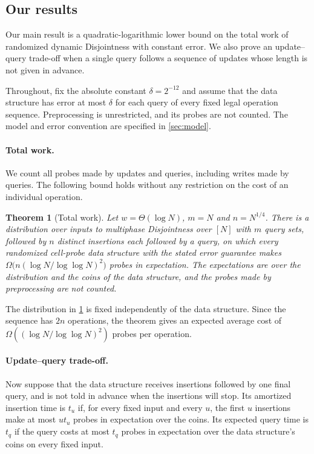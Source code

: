 \documentclass[11pt]{article}
\theoremstyle{plain}
\newtheorem{theorem}{Theorem}[section]
\begin{document}
\subsection{Our results}
Our main result is a quadratic-logarithmic lower bound on the total work of randomized dynamic Disjointness with constant error. We also prove an update--query trade-off when a single query follows a sequence of updates whose length is not given in advance.

Throughout, fix the absolute constant $\delta=2^{-12}$ and assume that the data structure has error at most $\delta$ for each query of every fixed legal operation sequence. Preprocessing is unrestricted, and its probes are not counted. The model and error convention are specified in \cref{sec:model}.

\paragraph{Total work.}
We count all probes made by updates and queries, including writes made by queries. The following bound holds without any restriction on the cost of an individual operation.

\begin{theorem}[Total work]\label{thm:total}
Let $w=\Theta(\log N)$, $m=N$ and $n=N^{1/4}$. There is a distribution over inputs to multiphase Disjointness over $[N]$ with $m$ query sets, followed by $n$ distinct insertions each followed by a query, on which every randomized cell-probe data structure with the stated error guarantee makes $\Omega\big(n(\log N/\log\log N)^2\big)$ probes in expectation.
The expectations are over the distribution and the coins of the data structure, and the probes made by preprocessing are not counted.
\end{theorem}

The distribution in \cref{thm:total} is fixed independently of the data structure. Since the sequence has $2n$ operations, the theorem gives an expected average cost of $\Omega((\log N/\log\log N)^2)$ probes per operation.

\paragraph{Update--query trade-off.}
Now suppose that the data structure receives insertions followed by one final query, and is not told in advance when the insertions will stop. Its amortized insertion time is $t_u$ if, for every fixed input and every $u$, the first $u$ insertions make at most $ut_u$ probes in expectation over the coins. Its expected query time is $t_q$ if the query costs at most $t_q$ probes in expectation over the data structure's coins on every fixed input.
\end{document}
